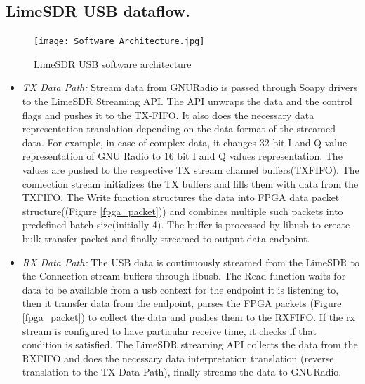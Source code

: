 \documentclass{kththesis}
\begin{document}
\subsection{LimeSDR USB dataflow.}
\begin{figure}[h!]
\centering
\texttt{[image: Software\_Architecture.jpg]}
\caption{LimeSDR USB software architecture}
\end{figure}

\begin{itemize}
\item{\textit{TX Data Path:} Stream data from GNURadio is passed through Soapy drivers to the LimeSDR Streaming API. The API unwraps the data and the control flags and pushes it to the TX-FIFO. It also does the necessary data representation translation depending on the data format of the streamed data. For example, in case of complex data, it changes 32 bit I and Q value representation of GNU Radio to 16 bit I and Q values representation.  The values are pushed to the respective TX stream channel buffers(TXFIFO). The connection stream initializes the TX buffers and fills them with data from the TXFIFO. The Write function structures the data into FPGA data packet structure((Figure \ref{fpga_packet})) and combines multiple such packets into predefined batch size(initially 4). The buffer is processed by libusb to create bulk transfer packet and finally streamed to output data endpoint.}

\item{\textit{RX Data Path: } The USB data is continuously streamed from the LimeSDR to the Connection stream buffers through libusb. The Read function waits for data to be available from a usb context for the endpoint it is listening to, then it transfer data from the endpoint, parses the FPGA packets (Figure \ref{fpga_packet}) to collect the data and pushes them to the RXFIFO. If the rx stream is configured to have particular receive time, it checks if that condition is satisfied. The LimeSDR streaming API collects the data from the RXFIFO and does the necessary data interpretation translation (reverse translation to the TX Data Path), finally streams the data to GNURadio. }
\end{itemize}
\end{document}
